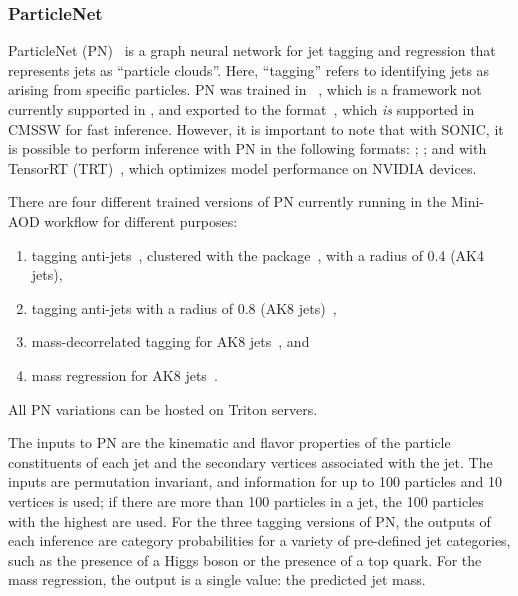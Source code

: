 \subsubsection{ParticleNet}
\label{sec:PN}

ParticleNet (PN)~\cite{Qu:2019gqs} is a graph neural network for jet tagging and regression that represents jets as ``particle clouds''. Here, ``tagging'' refers to identifying jets as arising from specific particles. PN was trained in \PYTORCH~\cite{pytorch}, which is a framework not currently supported in \CMSSW, and exported to the \ONNX format~\cite{onnx}, which \textit{is} supported in CMSSW for fast inference. However, it is important to note that with SONIC, it is possible to perform inference with PN in the following formats: \ONNX; \PYTORCH; and \PYTORCH with TensorRT (TRT)~\cite{tensorRT}, which optimizes model performance on NVIDIA devices.

There are four different trained versions of PN currently running in the Mini-AOD workflow for different purposes:
\begin{enumerate}
    \item tagging anti-\kt jets~\cite{Cacciari:2008gp}, clustered with the \FASTJET package~\cite{Cacciari:2011ma}, with a radius of 0.4 (AK4 jets),
    \item tagging anti-\kt jets with a radius of 0.8 (AK8 jets)~\cite{Sirunyan:2020lcu},
    \item mass-decorrelated tagging for AK8 jets~\cite{Sirunyan:2020lcu}, and
    \item mass regression for AK8 jets~\cite{CMS-DP-2021-017}.
\end{enumerate}
All PN variations can be hosted on Triton servers.

The inputs to PN are the kinematic and flavor properties of the particle constituents of each jet and the secondary vertices associated with the jet. The inputs are permutation invariant, and information for up to 100 particles and 10 vertices is used; if there are more than 100 particles in a jet, the 100 particles with the highest \pt are used. For the three tagging versions of PN, the outputs of each inference are category probabilities for a variety of pre-defined jet categories, such as the presence of a Higgs boson or the presence of a top quark. For the mass regression, the output is a single value: the predicted jet mass.


